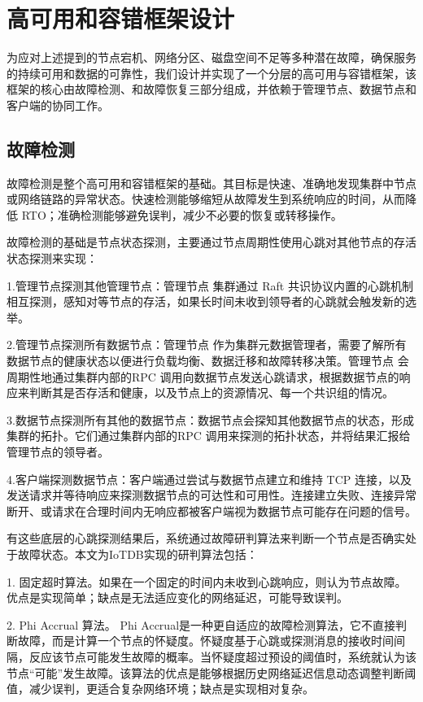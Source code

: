 \section{高可用和容错框架设计}

为应对上述提到的节点宕机、网络分区、磁盘空间不足等多种潜在故障，确保服务的持续可用和数据的可靠性，我们设计并实现了一个分层的高可用与容错框架，该框架的核心由故障检测、\failover 和故障恢复三部分组成，并依赖于管理节点、数据节点和客户端的协同工作。

\subsection{故障检测}

故障检测是整个高可用和容错框架的基础。其目标是快速、准确地发现集群中节点或网络链路的异常状态。快速检测能够缩短从故障发生到系统响应的时间，从而降低 RTO；准确检测能够避免误判，减少不必要的恢复或转移操作。

故障检测的基础是节点状态探测，主要通过节点周期性使用心跳对其他节点的存活状态探测来实现：

1.管理节点探测其他管理节点：管理节点 集群通过 Raft 共识协议内置的心跳机制相互探测，感知对等节点的存活，如果长时间未收到领导者的心跳就会触发新的选举。

2.管理节点探测所有数据节点：管理节点 作为集群元数据管理者，需要了解所有数据节点的健康状态以便进行负载均衡、数据迁移和故障转移决策。管理节点 会周期性地通过集群内部的RPC 调用向数据节点发送心跳请求，根据数据节点的响应来判断其是否存活和健康，以及节点上的资源情况、每一个共识组的情况。

3.数据节点探测所有其他的数据节点：数据节点会探知其他数据节点的状态，形成集群的拓扑。它们通过集群内部的RPC 调用来探测的拓扑状态，并将结果汇报给管理节点的领导者。

4.客户端探测数据节点：客户端通过尝试与数据节点建立和维持 TCP 连接，以及发送请求并等待响应来探测数据节点的可达性和可用性。连接建立失败、连接异常断开、或请求在合理时间内无响应都被客户端视为数据节点可能存在问题的信号。


有这些底层的心跳探测结果后，系统通过故障研判算法来判断一个节点是否确实处于故障状态。本文为IoTDB实现的研判算法包括：

1. 固定超时算法。如果在一个固定的时间内未收到心跳响应，则认为节点故障。优点是实现简单；缺点是无法适应变化的网络延迟，可能导致误判。

2. Phi Accrual 算法。 Phi Accrual是一种更自适应的故障检测算法，它不直接判断故障，而是计算一个节点的怀疑度。怀疑度基于心跳或探测消息的接收时间间隔，反应该节点可能发生故障的概率。当怀疑度超过预设的阈值时，系统就认为该节点“可能”发生故障。该算法的优点是能够根据历史网络延迟信息动态调整判断阈值，减少误判，更适合复杂网络环境；缺点是实现相对复杂。

